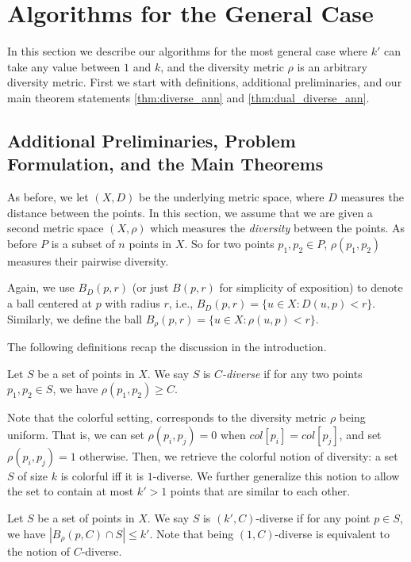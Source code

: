 \section{Algorithms for the General Case} \label{sec:general-algo}
In this section we describe our algorithms for the most general case where $k'$ can take any value between $1$ and $k$, and the diversity metric $\rho$ is an arbitrary diversity metric. First we start with definitions, additional preliminaries, and our main theorem statements \ref{thm:diverse_ann} and \ref{thm:dual_diverse_ann}.

\subsection{Additional Preliminaries, Problem Formulation, and the Main Theorems}

As before, we let $(X,D)$ be the underlying metric space, where $D$ measures the distance between the points. In this section, we assume that we are given a second metric space $(X,\rho)$ which measures the {\em diversity} between the points. As before $P$ is a subset of $n$ points in $X$. So for two points $p_1,p_2\in P$, $\rho(p_1,p_2)$ measures their pairwise diversity.

Again, we use $B_D(p,r)$ (or just $B(p,r)$ for simplicity of exposition) to denote a ball centered at $p$ with radius $r$, i.e.,  $B_D(p,r)=\{u\in X: D(u,p)<r\}$. Similarly, we define the ball $B_\rho(p,r)=\{u\in X: \rho(u,p)<r\}$. 


The following definitions recap the discussion in the introduction.

\begin{definition}[$C$-diverse]\label{def:minimal_distance}
Let $S$ be a set of points in $X$. We say $S$ is {\em $C$-diverse} if for any two points $p_1,p_2\in S$, we have $\rho(p_1,p_2)\geq C$. 
\end{definition}

Note that the colorful setting, corresponds to the diversity metric $\rho$ being uniform. That is, we can set $\rho(p_i,p_j)=0$ when $col[p_i]=col[p_j]$, and set $\rho(p_i,p_j)=1$ otherwise. Then, we retrieve the colorful notion of diversity: a set $S$ of size $k$ is colorful iff it is $1$-diverse.
We further generalize this notion to allow the set to contain at most $k'>1$ points that are similar to each other. 

\begin{definition}[$(k',C)$-diverse]\label{def:k'-minimal_distance}
Let $S$ be a set of points in $X$. We say $S$ is $(k',C)$-diverse if for any point $p\in S$, we have $|B_\rho(p,C)\cap S|\le k'$. 
Note that being $(1,C)$-diverse is equivalent to the notion of $C$-diverse.
\end{definition}


